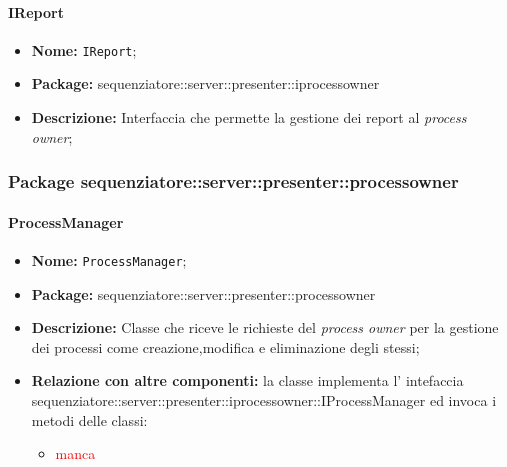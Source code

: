 \paragraph{IReport}
	\begin{itemize}
		\item \textbf{Nome:} \texttt{IReport};
		\item \textbf{Package:} sequenziatore::server::presenter::iprocessowner
		\item \textbf{Descrizione:} Interfaccia che permette la gestione dei report al \textit{process owner};
	\end{itemize}

\subsubsection{Package sequenziatore::server::presenter::processowner}

\paragraph{ProcessManager}
	\begin{itemize}
		\item \textbf{Nome:} \texttt{ProcessManager};
		\item \textbf{Package:} sequenziatore::server::presenter::processowner
		\item \textbf{Descrizione:} Classe che riceve le richieste del \textit{process owner} per la gestione dei processi come creazione,modifica e eliminazione degli stessi;
		\item \textbf{Relazione con altre componenti:} la classe implementa l' intefaccia sequenziatore::server::presenter::iprocessowner::IProcessManager ed invoca i metodi delle classi:
		\begin{itemize}
			\item \textcolor{red}{manca}
		\end{itemize}
	\end{itemize}

